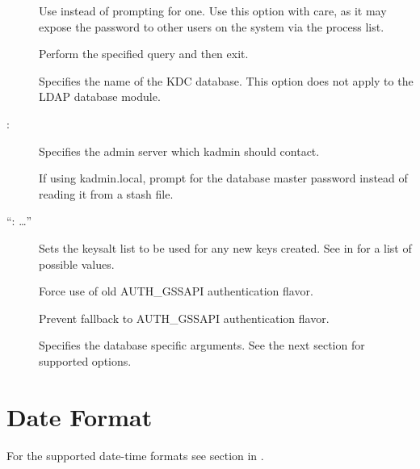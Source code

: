 \documentclass[letterpaper,10pt,english]{sphinxmanual}
\begin{document}
\begin{description}
\item[{ }] \leavevmode
Use  instead of prompting for one.  Use this option with
care, as it may expose the password to other users on the system
via the process list.

\item[{ }] \leavevmode
Perform the specified query and then exit.

\item[{ }] \leavevmode
Specifies the name of the KDC database.  This option does not
apply to the LDAP database module.

\item[{ \sphinxstyleemphasis{admin\_server}{[}:\sphinxstyleemphasis{port}{]}}] \leavevmode
Specifies the admin server which kadmin should contact.

\item[{}] \leavevmode
If using kadmin.local, prompt for the database master password
instead of reading it from a stash file.

\item[{ “: …”}] \leavevmode
Sets the keysalt list to be used for any new keys created.  See
{\hyperref[\detokenize{admin/conf_files/kdc_conf:keysalt-lists}]{}} in {\hyperref[\detokenize{admin/conf_files/kdc_conf:kdc-conf-5}]{}} for a list of possible
values.

\item[{}] \leavevmode
Force use of old AUTH\_GSSAPI authentication flavor.

\item[{}] \leavevmode
Prevent fallback to AUTH\_GSSAPI authentication flavor.

\item[{ }] \leavevmode
Specifies the database specific arguments.  See the next section
for supported options.

\end{description}


\section{Date Format}
\label{\detokenize{admin/database:date-format}}
For the supported date-time formats see  section
in .
\end{document}
